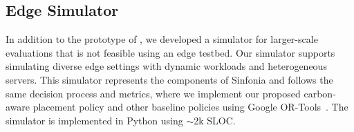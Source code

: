 





\subsection{\proposedsystem Edge Simulator}
In addition to the prototype of \proposedsystem, we developed a simulator for larger-scale evaluations 
that is not feasible using an edge testbed.
Our simulator supports
simulating diverse edge settings with dynamic workloads and heterogeneous servers. This simulator represents the components of Sinfonia and follows the same decision process and metrics, where we implement our proposed carbon-aware placement policy and other baseline policies using Google OR-Tools~\cite{ortools}. The \proposedsystem simulator is implemented in Python using $\sim$2k SLOC.

